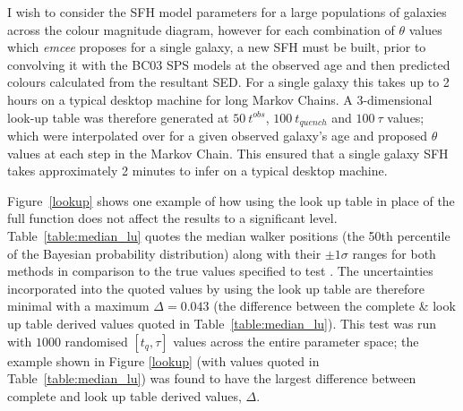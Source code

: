 \begin{table}
\end{table}

I wish to consider the SFH model parameters for a large populations of galaxies across the colour magnitude diagram, however for each combination of $\theta$ values which \emph{emcee} proposes for a single galaxy, a new SFH must be built, prior to convolving it with the BC03 SPS models at the observed age and then predicted colours calculated from the resultant SED. For a single galaxy this takes up to 2 hours on a typical desktop machine for long Markov Chains. A 3-dimensional look-up table was therefore generated at $50 ~t^{obs}$, $100 ~t_{quench}$ and $100 ~\tau$ values; which were interpolated over for a given observed galaxy's age and proposed $\theta$ values at each step in the Markov Chain. This ensured that a single galaxy SFH takes approximately 2 minutes to infer on a typical desktop machine. 

Figure~\ref{lookup} shows one example of how using the look up table in place of the full function does not affect the results to a significant level. Table~\ref{table:median_lu} quotes the median walker positions (the 50th percentile of the Bayesian probability distribution) along with their $\pm 1\sigma$ ranges for both methods in comparison to the true values specified to test \starpy. The uncertainties incorporated into the quoted values by using the look up table are therefore minimal with a maximum $\Delta = 0.043$ (the difference between the complete \& look up table derived values quoted in Table~\ref{table:median_lu}). This test was run with $1000$ randomised $[t_q, \tau]$ values across the entire parameter space; the example shown in Figure \ref{lookup} (with values quoted in Table~\ref{table:median_lu}) was found to have the largest difference between complete and look up table derived values, $\Delta$. 

